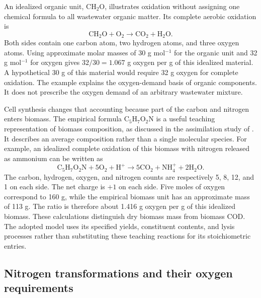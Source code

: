 An idealized organic unit, $\mathrm{CH_2O}$, illustrates oxidation without assigning one chemical formula to all wastewater organic matter. Its complete aerobic oxidation is
\begin{equation}
\mathrm{CH_2O}+\mathrm{O_2}\longrightarrow\mathrm{CO_2}+\mathrm{H_2O}.
\label{eq:teaching_carbon_oxidation}
\end{equation}
Both sides contain one carbon atom, two hydrogen atoms, and three oxygen atoms. Using approximate molar masses of 30 g mol$^{-1}$ for the organic unit and 32 g mol$^{-1}$ for oxygen gives $32/30=1.067$ g oxygen per g of this idealized material. A hypothetical 30 g of this material would require 32 g oxygen for complete oxidation. The example explains the oxygen-demand basis of organic components. It does not prescribe the oxygen demand of an arbitrary wastewater mixture.

Cell synthesis changes that accounting because part of the carbon and nitrogen enters biomass. The empirical formula $\mathrm{C_5H_7O_2N}$ is a useful teaching representation of biomass composition, as discussed in the assimilation study of \citet{Hoover1952}. It describes an average composition rather than a single molecular species. For example, an idealized complete oxidation of this biomass with nitrogen released as ammonium can be written as
\begin{equation}
\mathrm{C_5H_7O_2N}+5\mathrm{O_2}+\mathrm{H^+}
\longrightarrow5\mathrm{CO_2}+\mathrm{NH_4^+}+2\mathrm{H_2O}.
\label{eq:teaching_biomass_oxidation}
\end{equation}
The carbon, hydrogen, oxygen, and nitrogen counts are respectively 5, 8, 12, and 1 on each side. The net charge is $+1$ on each side. Five moles of oxygen correspond to 160 g, while the empirical biomass unit has an approximate mass of 113 g. The ratio is therefore about 1.416 g oxygen per g of this idealized biomass. These calculations distinguish dry biomass mass from biomass COD. The adopted model uses its specified yields, constituent contents, and lysis processes rather than substituting these teaching reactions for its stoichiometric entries.

\subsection{Nitrogen transformations and their oxygen requirements}

